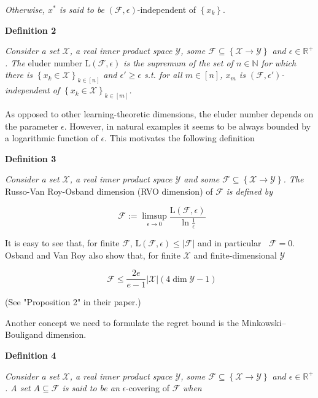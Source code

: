 \documentclass[a4paper]{article}
\newcommand{\Co}[1]{}
\newcommand{\AP}[1]{\left(#1\right)}
\newcommand{\AC}[1]{\left\{#1\right\}}
\newcommand{\Nats}{\mathbb{N}}
\newcommand{\Reals}{\mathbb{R}}
\newcommand{\Abs}[1]{\left\vert #1 \right\vert}
\newcommand{\X}{\mathcal{X}}
\newcommand{\Y}{\mathcal{Y}}
\newcommand{\F}{\mathcal{F}}
\newcommand{\El}{\mathrm{L}}
\DeclareMathOperator{\RVO}{\dim_{RVO}}
\begin{document}
\textit{Otherwise, $x^*$ is said to be}\Co{i} $\AP{\F,\epsilon}$-independent of $\AC{x_k}$.

\textbf{Definition 2}\Co{b}

\textit{Consider a set $\X$, a real inner product space $\Y$, some $\F\subseteq\AC{\X\rightarrow\Y}$ and $\epsilon\in\Reals^+$. The}\Co{i} eluder number $\El(\F,\epsilon)$ \textit{is the supremum of the set of $n\in\Nats$ for which there is $\AC{x_k\in\X}_{k\in[n]}$ and $\epsilon'\geq\epsilon$ s.t. for all $m\in[n]$, $x_m$ is $\AP{\F,\epsilon'}$-independent of $\AC{x_k\in\X}_{k\in[m]}$.}\Co{i}


As opposed to other learning-theoretic dimensions, the eluder number depends on the parameter $\epsilon$. However, in natural examples it seems to be always bounded by a logarithmic function of $\epsilon$. This motivates the following definition

\textbf{Definition 3}\Co{b}

\textit{Consider a set $\X$, a real inner product space $\Y$ and some $\F\subseteq\AC{\X\rightarrow\Y}$. The}\Co{i} Russo-Van Roy-Osband dimension (RVO dimension) of $\F$ \textit{is defined by}\Co{i}

$$\RVO{\F}:=\limsup_{\epsilon \rightarrow 0}{\frac{\El(\F,\epsilon)}{\ln\frac{1}{\epsilon}}}$$

It is easy to see that, for finite $\F$, $\El(\F,\epsilon)\leq\Abs{\F}$ and in particular $\RVO\F=0$. Osband and Van Roy also show that, for finite $\X$ and finite-dimensional $\Y$

$$\RVO\F\leq \frac{2e}{e-1}\Abs{\X}\AP{4\dim{\Y}-1}$$

(See "Proposition 2" in their paper.) \Co{The bound on prediction dimension for "cellular decision processes" we demonstrated [before](https://www.alignmentforum.org/posts/zTf946PQwN2AN3X3Y/entropic-regret-i-deterministic-mdps) also carries over, since eluder number is trivially bounded by prediction dimension in the deterministic case. It would also be interesting to investigate stochastic versions of cellular decision processes, but we will not attempt it at present.}

Another concept we need to formulate the regret bound is the Minkowski–Bouligand dimension.

\textbf{Definition 4}\Co{b}

\textit{Consider a set $\X$, a real inner product space $\Y$, some $\F\subseteq\AC{\X\rightarrow\Y}$ and $\epsilon\in\Reals^+$. A set $A\subseteq\F$ is said to be an}\Co{i} $\epsilon$-covering of $\F$ \textit{when}\Co{i}
\end{document}

